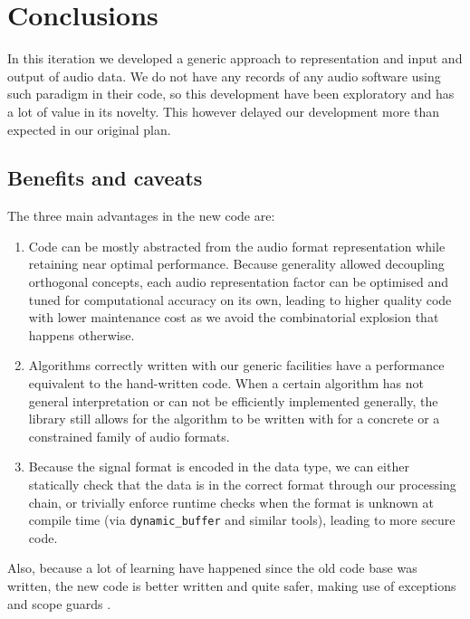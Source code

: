 \section{Conclusions}

In this iteration we developed a generic approach to representation
and input and output of audio data. We do not have any records of
any audio software using such paradigm in their code, so this
development have been exploratory and has a lot of value in its
novelty. This however delayed our development more than expected in
our original plan.

\subsection{Benefits and caveats}
\label{sec:soundbenefits}

The three main advantages in the new code are:
\begin{enumerate}
\item Code can be mostly abstracted from the audio format
  representation while retaining near optimal performance. Because
  generality allowed decoupling orthogonal concepts, each audio
  representation factor can be optimised and tuned for computational
  accuracy on its own, leading to higher quality code with lower
  maintenance cost as we avoid the combinatorial explosion that
  happens otherwise.

\item Algorithms correctly written with our generic facilities have a
  performance equivalent to the hand-written code. When a certain
  algorithm has not general interpretation or can not be efficiently
  implemented generally, the library still allows for the algorithm to
  be written with for a concrete or a constrained family of audio
  formats.

\item Because the signal format is encoded in the data type, we can
  either statically check that the data is in the correct format
  through our processing chain, or trivially enforce runtime checks
  when the format is unknown at compile time (via
  \texttt{dynamic\_buffer} and similar tools), leading to more secure
  code.
\end{enumerate}

Also, because a lot of learning have happened since the old code base
was written, the new code is better written and quite safer, making
use of exceptions and scope guards \cite{alexandrescu00gener}.


